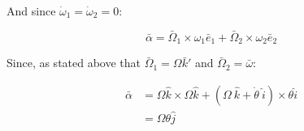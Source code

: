 \documentclass[12pt, letterpaper]{../assignment}
\begin{document}
And since $\dot{\omega}_1 = \dot{\omega}_2 = 0$:

$$ \bar{\alpha} =
\bar{\Omega}_1 \times \omega_1 \bar{e}_1 +
\bar{\Omega}_2 \times \omega_2 \bar{e}_2 $$

Since, as stated above that $\bar{\Omega}_1 = \Omega \bar{k}'$ and $\bar{\Omega}_2 = \bar{\omega}$:

\begin{equation*}
\begin{aligned}
\bar{\alpha} &= \Omega \hat{k} \times \Omega \hat{k} + \left( \Omega\ \hat{k} + \dot{\theta}\ \hat{i} \right) \times \theta \hat{i} \\
             &= \Omega \theta \hat{j}
\end{aligned}
\end{equation*}



\end{document}
